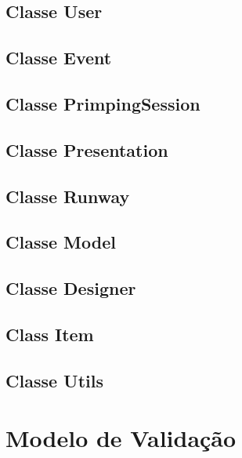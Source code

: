 \documentclass{article}
\begin{document}

\subsection{Classe User}


\subsection{Classe Event}


\subsection{Classe PrimpingSession}


\subsection{Classe Presentation}


\subsection{Classe Runway}


\subsection{Classe Model}


\subsection{Classe Designer}

\subsection{Class Item}


\subsection{Classe Utils}



\section{Modelo de Validação}
\end{document}

